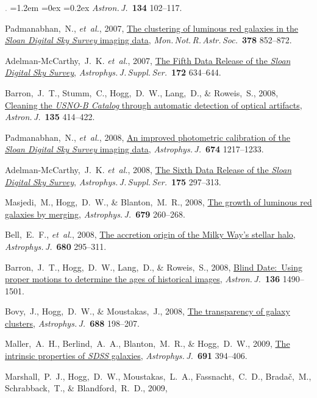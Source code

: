 \documentclass[10pt,letterpaper]{article}
\newcommand{\acronym}[1]{{\small{#1}}}
\newcommand{\foreign}[1]{\textsl{#1}}
\newcommand{\etal}{\foreign{et~al.}}
\newcommand{\project}[1]{\textsl{#1}}
\newcommand{\doi}[2]{\href{http://dx.doi.org/#1}{{#2}}}
\newcommand{\deemph}[1]{\textcolor{grey}{\footnotesize{#1}}}
\newcommand{\pubnumber}[1]{\deemph{{#1}.}}
\newcounter{refpubnum}
\newcommand{\hogglist}{%
    \rightmargin=0in
    \leftmargin=1.2em
    \topsep=0ex
    \partopsep=0pt
    \itemsep=0.2ex
    \parsep=0pt
    \itemindent=-1.0\leftmargin
    \listparindent=0.0\leftmargin
    \settowidth{\labelsep}{~}
    \usecounter{refpubnum}
  }
\begin{document}
\begin{list}{\pubnumber{\therefpubnum}}{\hogglist}
\textit{Astron.\,J.}\ \textbf{134} 102--117.
\item
Padmanabhan,~N., \etal, 2007,
\doi{10.1111/j.1365-2966.2007.11593.x}{The clustering of luminous red galaxies in the \project{Sloan Digital Sky Survey} imaging data},
\textit{Mon.\,Not.\,R.\,Astr.\,Soc.}\ \textbf{378} 852--872.
\item
Adelman-McCarthy,~J.~K. \etal, 2007,
\doi{10.1086/518864}{The Fifth Data Release of the \project{Sloan Digital Sky Survey}},
\textit{Astrophys.\,J.\,Suppl.\,Ser.}\ \textbf{172} 634--644.
\item
Barron,~J.~T., Stumm,~C., Hogg,~D.~W., Lang,~D., \& Roweis,~S., 2008,
\doi{10.1088/0004-6256/135/1/414}{Cleaning the \project{\acronym{USNO-B} Catalog} through automatic detection of optical artifacts},
\textit{Astron.\,J.}\ \textbf{135} 414--422.
\item
Padmanabhan,~N., \etal, 2008,
\doi{10.1086/524677}{An improved photometric calibration of the \project{Sloan Digital Sky Survey} imaging data},
\textit{Astrophys.\,J.}\ \textbf{674} 1217--1233.
\item
Adelman-McCarthy,~J.~K. \etal, 2008,
\doi{10.1086/524984}{The Sixth Data Release of the \project{Sloan Digital Sky Survey}},
\textit{Astrophys.\,J.\,Suppl.\,Ser.}\ \textbf{175} 297--313.
\item
Masjedi,~M., Hogg,~D.~W., \& Blanton,~M.~R., 2008,
\doi{10.1086/586696}{The growth of luminous red galaxies by merging},
\textit{Astrophys.\,J.}\ \textbf{679} 260--268.
\item
Bell,~E.~F., \etal, 2008,
\doi{10.1086/588032}{The accretion origin of the Milky Way's stellar halo},
\textit{Astrophys.\,J.}\ \textbf{680} 295--311.
\item
Barron,~J.~T., Hogg,~D.~W., Lang,~D., \& Roweis,~S., 2008,
\doi{10.1088/0004-6256/136/4/1490}{Blind Date:\ Using proper motions to determine the ages of historical images},
\textit{Astron.\,J.}\ \textbf{136} 1490--1501.
\item
Bovy,~J., Hogg,~D.~W., \& Moustakas,~J., 2008,
\doi{10.1086/592187}{The transparency of galaxy clusters},
\textit{Astrophys.\,J.}\ \textbf{688} 198--207.
\item
Maller,~A.~H., Berlind,~A.~A., Blanton,~M.~R., \& Hogg,~D.~W., 2009,
\doi{10.1088/0004-637X/691/1/394}{The intrinsic properties of \project{\acronym{SDSS}} galaxies},
\textit{Astrophys.\,J.}\ \textbf{691} 394--406.
\item
Marshall,~P.~J., Hogg,~D.~W., Moustakas,~L.~A., Fassnacht,~C.~D.,
Brada\v{c},~M., Schrabback,~T., \& Blandford,~R.~D., 2009,

\end{list}
\end{document}
